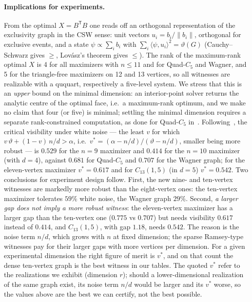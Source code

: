 \documentclass[11pt]{article}
\renewcommand{\theta}{\vartheta}
\begin{document}
\paragraph{Implications for experiments.} From the optimal $X=B^{\mathsf T}B$ one reads off an orthogonal representation of the exclusivity graph in the CSW sense: unit vectors $u_i=b_i/\|b_i\|$, orthogonal for exclusive events, and a state $\psi\propto\sum_i b_i$ with $\sum_i\langle\psi,u_i\rangle^2=\theta(G)$ (Cauchy--Schwarz gives $\ge$, Lov\'asz's theorem gives $\le$). The rank of the maximum-rank optimal $X$ is 4 for all maximizers with $n\le 11$ and for Quad-$C_5$ and Wagner, and 5 for the triangle-free maximizers on 12 and 13 vertices, so all witnesses are realizable with a ququart, respectively a five-level system. We stress that this is an \emph{upper} bound on the minimal dimension: an interior-point solver returns the analytic centre of the optimal face, i.e.\ a maximum-rank optimum, and we make no claim that four (or five) is minimal; settling the minimal dimension requires a separate rank-constrained computation, as done for Quad-$C_5$ in~\cite{tamer2026}. Following~\cite{tamer2026}, the critical visibility under white noise --- the least $v$ for which $v\,\theta+(1-v)\,n/d>\alpha$, i.e.\ $v^*=(\alpha-n/d)/(\theta-n/d)$, smaller being more robust --- is $0.529$ for the $n=9$ maximizer and $0.414$ for the $n=10$ maximizer (with $d=4$), against $0.681$ for Quad-$C_5$ and $0.707$ for the Wagner graph; for the eleven-vertex maximizer $v^*=0.617$ and for $C_{13}(1,5)$ (in $d=5$) $v^*=0.542$. Two conclusions for experiment design follow. First, the new nine- and ten-vertex witnesses are markedly more robust than the eight-vertex ones: the ten-vertex maximizer tolerates $59\%$ white noise, the Wagner graph $29\%$. Second, \emph{a larger gap does not imply a more robust witness}: the eleven-vertex maximizer has a larger gap than the ten-vertex one ($0.775$ vs $0.707$) but needs visibility $0.617$ instead of $0.414$, and $C_{13}(1,5)$, with gap $1.18$, needs $0.542$. The reason is the noise term $n/d$, which grows with $n$ at fixed dimension; the sparse Ramsey-type witnesses pay for their larger gaps with more vertices per dimension. For a given experimental dimension the right figure of merit is $v^*$, and on that count the dense ten-vertex graph is the best witness in our tables. The quoted $v^*$ refer to the realizations we exhibit (dimension $r$); should a lower-dimensional realization of the same graph exist, its noise term $n/d$ would be larger and its $v^*$ worse, so the values above are the best we can certify, not the best possible.
\end{document}
